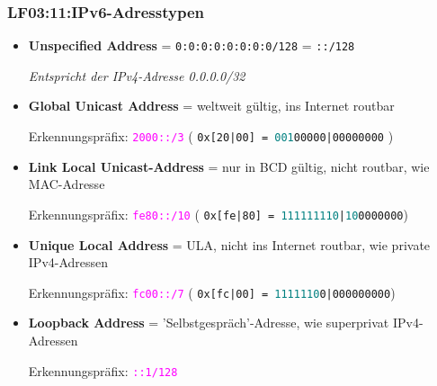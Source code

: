 \begin{frame}
  \frametitle{LF03:11:IPv6-Adresstypen}

  \begin{footnotesize}

  \begin{itemize}
    \item \textbf{Unspecified Address} = \texttt{0:0:0:0:0:0:0:0/128} = \texttt{::/128} \\
    \begin{tiny}{\textit{ Entspricht der IPv4-Adresse 0.0.0.0/32}}\end{tiny}

    \item \textbf{Global Unicast Address} =  weltweit gültig, ins Internet routbar \\
    \begin{tiny}{Erkennungspräfix: \textcolor{magenta}{\texttt{2000::/3}} 
      ( \texttt{0x[20|00] = \textcolor{teal}{001}00000|00000000} })
    \end{tiny}

    \item \textbf{Link Local Unicast-Address} = nur in BCD gültig, nicht routbar, wie MAC-Adresse\\
    \begin{tiny}{Erkennungspräfix: \textcolor{magenta}{\texttt{fe80::/10}} 
      ( \texttt{0x[fe|80] = \textcolor{teal}{111111110}|\textcolor{teal}{10}0000000})}
    \end{tiny}

    \item \textbf{Unique Local Address} = ULA, nicht ins Internet routbar, wie private IPv4-Adressen \\
    \begin{tiny}{Erkennungspräfix: \textcolor{magenta}{\texttt{fc00::/7}} 
      ( \texttt{0x[fc|00] = \textcolor{teal}{1111110}0|000000000})}\end{tiny}
    
    \item \textbf{Loopback Address} = 'Selbstgespräch'-Adresse, wie superprivat IPv4-Adressen \\
    \begin{tiny}Erkennungspräfix: \textcolor{magenta}{\texttt{::1/128}} \end{tiny}


  \end{itemize}

  \begin{tiny}


\end{tiny}
\end{footnotesize}
\end{frame}
